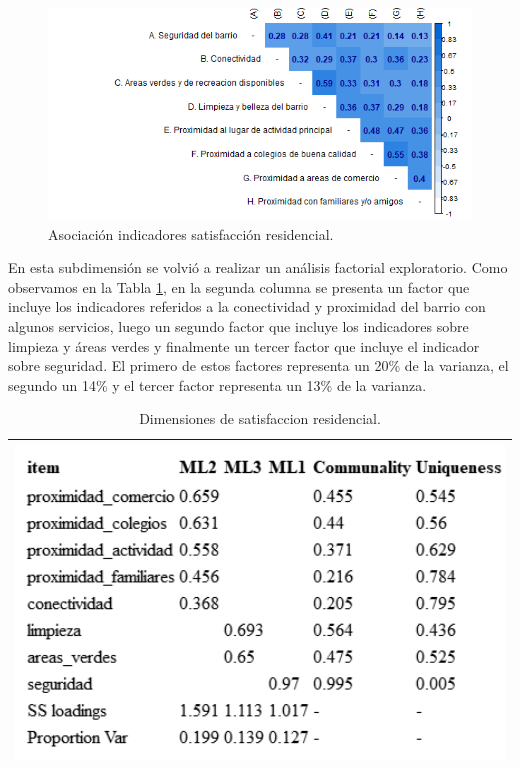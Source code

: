 \documentclass[
  12pt,
]{book}
\begin{document}
\begin{figure}[H]

{\centering \includegraphics[width=1\linewidth,height=1\textheight]{output/graphs/satisfaccion-residencial_cor} 

}

\caption{Asociación indicadores satisfacción residencial.}\label{fig:satisfaccion-residencial-cor}
\end{figure}

En esta subdimensión se volvió a realizar un análisis factorial exploratorio. Como observamos en la Tabla \ref{tab:satisfaccion-barrial-fa}, en la segunda columna se presenta un factor que incluye los indicadores referidos a la conectividad y proximidad del barrio con algunos servicios, luego un segundo factor que incluye los indicadores sobre limpieza y áreas verdes y finalmente un tercer factor que incluye el indicador sobre seguridad. El primero de estos factores representa un 20\% de la varianza, el segundo un 14\% y el tercer factor representa un 13\% de la varianza.

\begin{longtable}[]{@{}l@{}}
\caption{\label{tab:satisfaccion-barrial-fa}Dimensiones de satisfaccion residencial.}\tabularnewline
\toprule
\endhead
\includegraphics[width=5.20833in,height=\textheight]{output/tables/sat_residencial_fa.png} \\
\bottomrule
\end{longtable}
\end{document}
